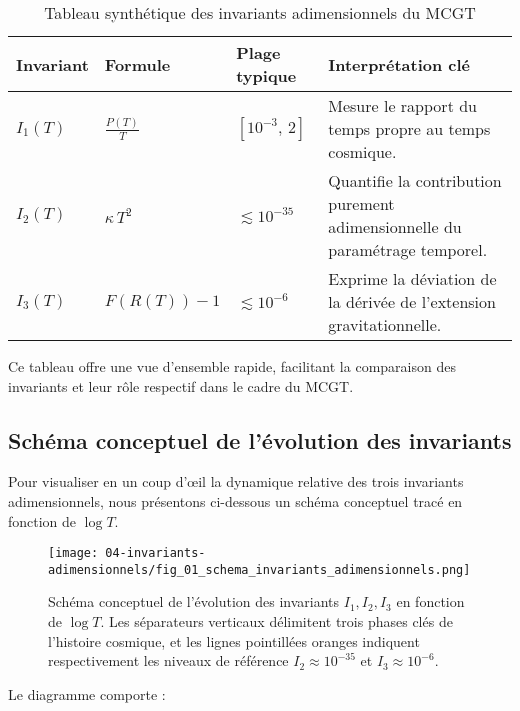 \begin{table}[htbp]
  \centering
  \caption{Tableau synthétique des invariants adimensionnels du MCGT}
  \label{tab:invariants_synth}
  \begin{tabular}{l l l p{}}
    \toprule
    Invariant & Formule & Plage typique & Interprétation clé \\
    \midrule
    \(I_{1}(T)\) & \(\displaystyle \frac{P(T)}{T}\) 
                  & \([10^{-3},\,2]\) 
                  & Mesure le rapport du temps propre au temps cosmique. \\
    \(I_{2}(T)\) & \(\displaystyle \kappa\,T^{2}\) 
                  & \(\lesssim 10^{-35}\) 
                  & Quantifie la contribution purement adimensionnelle du paramétrage temporel. \\
    \(I_{3}(T)\) & \(\displaystyle F(R(T)) - 1\) 
                  & \(\lesssim 10^{-6}\) 
                  & Exprime la déviation de la dérivée de l’extension gravitationnelle. \\
    \bottomrule
  \end{tabular}
\end{table}

Ce tableau offre une vue d’ensemble rapide, facilitant la comparaison des invariants et leur rôle respectif dans le cadre du MCGT.

\subsection{Schéma conceptuel de l’évolution des invariants}

Pour visualiser en un coup d’œil la dynamique relative des trois invariants adimensionnels, nous présentons ci-dessous un schéma conceptuel tracé en fonction de \(\log T\).

\begin{figure}[htbp]
  \centering
  \texttt{[image: 04-invariants-adimensionnels/fig\_01\_schema\_invariants\_adimensionnels.png]}
  \caption{Schéma conceptuel de l’évolution des invariants \(I_{1},I_{2},I_{3}\) en fonction de \(\log T\).  
    Les séparateurs verticaux délimitent trois phases clés de l’histoire cosmique,  
    et les lignes pointillées oranges indiquent respectivement les niveaux de référence  
    \(I_{2}\approx10^{-35}\) et \(I_{3}\approx10^{-6}\).}
  \label{fig:04_schema_invariants}
\end{figure}

Le diagramme comporte :

